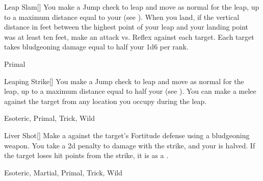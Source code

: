 \lowercase{\hypertarget{maneuver:Leap Slam}{}}\label{maneuver:Leap Slam}
\hypertarget{maneuver:Leap Slam}{}
\begin{freeability}[Rank 3]{Leap Slam}[]
You make a Jump check to leap and move as normal for the leap, up to a maximum distance equal to your  (see ).
When you land, if the vertical distance in feet between the highest point of your leap and your landing point was at least ten feet, make an attack vs. Reflex against each target.
\hit Each target takes bludgeoning damage equal to half your  \add 1d6 per rank.


 Primal
\end{freeability}
\vspace{0.25em}



\lowercase{\hypertarget{maneuver:Leaping Strike}{}}\label{maneuver:Leaping Strike}
\hypertarget{maneuver:Leaping Strike}{}
\begin{freeability}[Rank 3]{Leaping Strike}[]
You make a Jump check to leap and move as normal for the leap, up to a maximum distance equal to half your  (see ).
You can make a melee  against the target from any location you occupy during the leap.


 Esoteric, Primal, Trick, Wild
\end{freeability}
\vspace{0.25em}



\lowercase{\hypertarget{maneuver:Liver Shot}{}}\label{maneuver:Liver Shot}
\hypertarget{maneuver:Liver Shot}{}
\begin{freeability}[Rank 3]{Liver Shot}[]
Make a  against the target's Fortitude defense using a bludgeoning weapon.
You take a \minus2d penalty to damage with the strike, and your  is halved.
If the target loses hit points from the strike, it is  as a .


 Esoteric, Martial, Primal, Trick, Wild
\end{freeability}
\vspace{0.25em}



